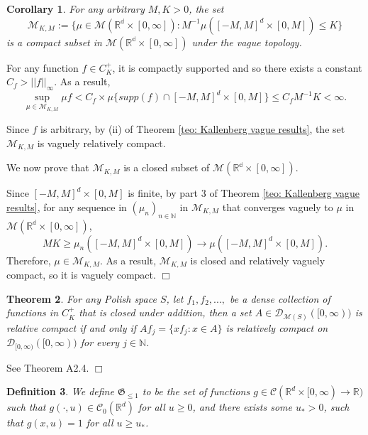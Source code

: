 \documentclass[12pt]{article}
\newenvironment {proof}{{\noindent\bf Proof }}{\hfill $\Box$ \medskip}
\newtheorem{theorem}{Theorem}[section]
\newtheorem{corollary}[theorem]{Corollary}
\newtheorem{definition}[theorem]{Definition}
\newcommand{\IR}{\mathbb R}
\begin{document}
\begin{corollary}
\label{cor: Vague Compact sets}
For any arbitrary $M,K>0$, the set 
$$\mathcal{M}_{K,M}:= \{\mu \in \mathcal{M}(\mathbb{R^d} \times [0, \infty]): M^{-1}\mu([-M,M]^d \times [0,M]) \leq K\}$$   
is a compact subset in 
$\mathcal{M}(\mathbb{R^d} \times [0, \infty])$ 
under the vague topology.
\end{corollary}
\begin{proof}
For any function $f \in C^{+}_K$, it is compactly supported and
so there exists a constant $C_f > ||f||_{\infty}$.
As a result, 
$$\sup_{\mu \in \mathcal{M}_{K,M}} \mu f < C_f \times \mu \{ supp(f) \cap [-M,M]^d \times [0,M]\} \leq C_f M^{-1} K < \infty.$$

Since $f$ is arbitrary, by (ii) of Theorem \ref{teo: Kallenberg vague results}, 
the set
$\mathcal{M}_{K,M}$
is vaguely relatively compact. 

We now prove that $\mathcal{M}_{K,M}$ is a closed subset of $\mathcal{M}(\mathbb{R^d} \times [0, \infty])$.

Since $[-M,M]^d \times [0,M]$ is finite, by part 3 of Theorem \ref{teo: Kallenberg vague results},
for any sequence in $(\mu_n)_{n \in \mathbb{N}}$ in  $\mathcal{M}_{K,M}$ that converges vaguely to $\mu$ in 
$ \mathcal{M}(\mathbb{R^d} \times [0, \infty])$, 
$$MK \geq \mu_n([-M,M]^d \times [0,M]) \to \mu([-M,M]^d \times [0,M]).$$
Therefore, $\mu \in \mathcal{M}_{K,M}$.
As a result, $\mathcal{M}_{K,M}$ is closed and relatively vaguely compact, so it is vaguely compact.
\end{proof}

\begin{theorem}
    \label{teo: Vague Relative Compactness through Projection}
For any Polish space $S$, let $f_1,f_2,...,$ be a dense collection of functions in $C^{+}_{K}$ that is closed under addition, then a set $A \in \mathcal{D}_{\mathcal{M}(S)}([0,\infty))$ is relative compact if and only if $Af_j = \{xf_j: x \in A\}$ is relatively compact on $\mathcal{D}_{[0, \infty)}([0,\infty))$ for every $j \in \mathbb{N}$.
\end{theorem}
\begin{proof}
See \cite{kallenberg1997foundations} Theorem A2.4.
\end{proof}
\begin{definition}
We define $\mathfrak{G}_{\leq 1}$ to be the set of functions $g \in \mathcal{C}(\IR^d \times [0, \infty) \to \IR)$ such that 
$g(\cdot, u) \in \mathcal{C}_{0}(\IR^d)$ for all $u \geq 0$, and there exists some $u_{*}>0$, such that $g(x,u)=1$ for all $u \geq u_{*}$.
\end{definition}
\end{document}
